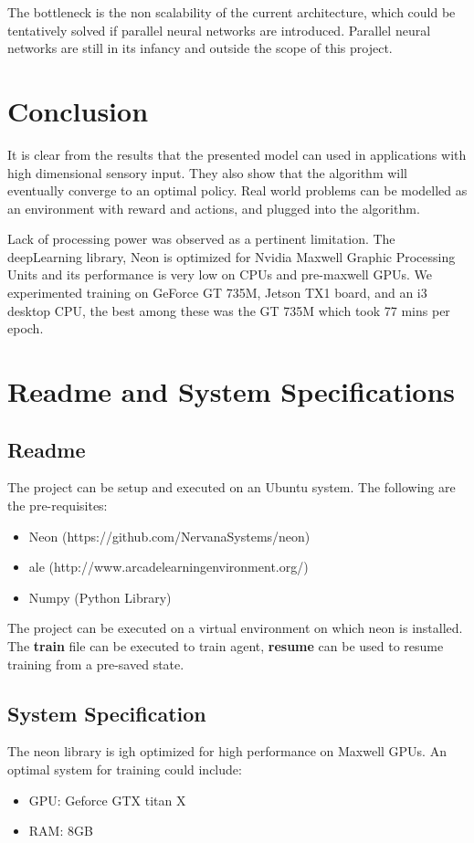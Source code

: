 \documentclass[a4paper,12pt]{report}
\begin{document}
				The bottleneck is the non scalability of the current architecture, which could be tentatively solved if parallel neural networks are introduced. Parallel neural networks are still in its infancy and outside the scope of this project.
	\chapter{Conclusion}
		It is clear from the results that the presented model can used in applications with high dimensional sensory input\cite{stock}\cite{network}\cite{IOT}\cite{Go}. They also show that the algorithm will eventually converge to an optimal policy. Real world problems can be modelled as an environment with reward and actions, and plugged into the algorithm.

		Lack of processing power was observed as a pertinent limitation. The deepLearning library, Neon is optimized for Nvidia Maxwell Graphic Processing Units and its performance is very low on CPUs and pre-maxwell GPUs. We experimented training on GeForce GT 735M, Jetson TX1 board, and an i3 desktop CPU, the best among these was the GT 735M which took 77 mins per epoch.


	\newpage
	\nocite{*}
	
	
\appendix
	\chapter{Readme and System Specifications}
		\section{Readme}
		The project can be setup and executed on an Ubuntu system. The following are the pre-requisites:
		\begin{itemize}
				\item Neon (https://github.com/NervanaSystems/neon)
				\item \ac{ale} (http://www.arcadelearningenvironment.org/)
				\item Numpy (Python Library)
		\end{itemize}
		The project can be executed on a virtual environment on which neon is installed. The \textbf{train} file can be executed to train agent, \textbf{resume} can be used to resume training from a pre-saved state. 
		\section{System Specification}
		The neon library is igh optimized for high performance on Maxwell GPUs. An optimal system for training could include:
		\begin{itemize}
				\item GPU: Geforce GTX titan X
				\item RAM: 8GB
		\end{itemize}
\end{document}
